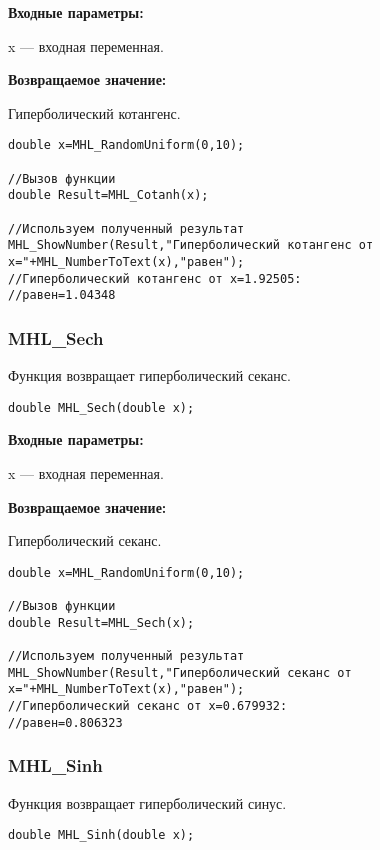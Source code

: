 \documentclass[a4paper,12pt]{article}
\begin{document}
\textbf{Входные параметры:}

 x --- входная переменная.

\textbf{Возвращаемое значение:}

Гиперболический котангенс.


\begin{lstlisting}[label=code_use_MHL_Cotanh,caption=Пример использования]
double x=MHL_RandomUniform(0,10);

//Вызов функции
double Result=MHL_Cotanh(x);

//Используем полученный результат
MHL_ShowNumber(Result,"Гиперболический котангенс от x="+MHL_NumberToText(x),"равен");
//Гиперболический котангенс от x=1.92505:
//равен=1.04348
\end{lstlisting}

\subsubsection{MHL\_Sech}\label{MHL_Sech}

Функция возвращает гиперболический секанс.


\begin{lstlisting}[label=code_syntax_MHL_Sech,caption=Синтаксис]
double MHL_Sech(double x);
\end{lstlisting}

\textbf{Входные параметры:}

 x --- входная переменная.

\textbf{Возвращаемое значение:}

Гиперболический секанс.


\begin{lstlisting}[label=code_use_MHL_Sech,caption=Пример использования]
double x=MHL_RandomUniform(0,10);

//Вызов функции
double Result=MHL_Sech(x);

//Используем полученный результат
MHL_ShowNumber(Result,"Гиперболический секанс от x="+MHL_NumberToText(x),"равен");
//Гиперболический секанс от x=0.679932:
//равен=0.806323
\end{lstlisting}

\subsubsection{MHL\_Sinh}\label{MHL_Sinh}

Функция возвращает гиперболический синус.


\begin{lstlisting}[label=code_syntax_MHL_Sinh,caption=Синтаксис]
double MHL_Sinh(double x);
\end{lstlisting}
\end{document}
